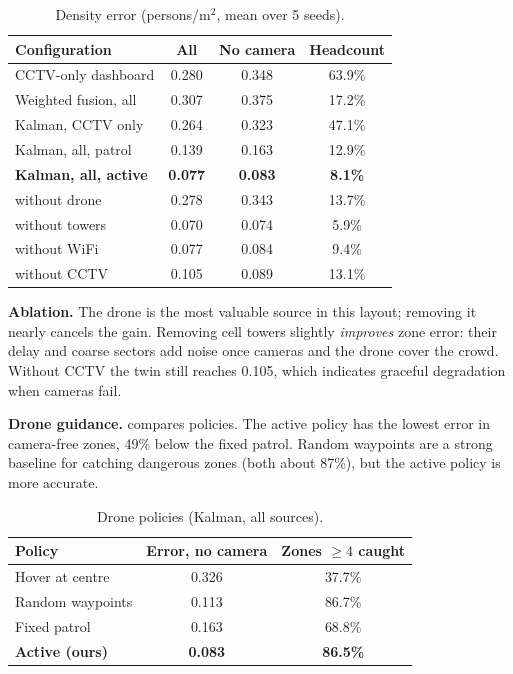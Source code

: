 \documentclass[10pt,twocolumn]{article}
\begin{document}
\begin{table}[t]
\centering\small
\caption{Density error (persons/m$^2$, mean over 5 seeds).}
\label{tab:fusion}
\begin{tabular}{@{}lccc@{}}
\toprule
Configuration & All & No camera & Headcount \\
\midrule
CCTV-only dashboard & 0.280 & 0.348 & 63.9\% \\
Weighted fusion, all & 0.307 & 0.375 & 17.2\% \\
Kalman, CCTV only & 0.264 & 0.323 & 47.1\% \\
Kalman, all, patrol & 0.139 & 0.163 & 12.9\% \\
\textbf{Kalman, all, active} & \textbf{0.077} & \textbf{0.083} & \textbf{8.1\%} \\
\midrule
\quad without drone & 0.278 & 0.343 & 13.7\% \\
\quad without towers & 0.070 & 0.074 & 5.9\% \\
\quad without WiFi & 0.077 & 0.084 & 9.4\% \\
\quad without CCTV & 0.105 & 0.089 & 13.1\% \\
\bottomrule
\end{tabular}
\end{table}

\textbf{Ablation.} The drone is the most valuable source in this layout; removing it nearly cancels the gain. Removing cell towers slightly \emph{improves} zone error: their delay and coarse sectors add noise once cameras and the drone cover the crowd. Without CCTV the twin still reaches 0.105, which indicates graceful degradation when cameras fail.

\textbf{Drone guidance.}  compares policies. The active policy has the lowest error in camera-free zones, 49\% below the fixed patrol. Random waypoints are a strong baseline for catching dangerous zones (both about 87\%), but the active policy is more accurate.

\begin{table}[t]
\centering\small
\caption{Drone policies (Kalman, all sources).}
\label{tab:drone}
\begin{tabular}{@{}lcc@{}}
\toprule
Policy & Error, no camera & Zones $\geq 4$ caught \\
\midrule
Hover at centre & 0.326 & 37.7\% \\
Random waypoints & 0.113 & 86.7\% \\
Fixed patrol & 0.163 & 68.8\% \\
\textbf{Active (ours)} & \textbf{0.083} & \textbf{86.5\%} \\
\bottomrule
\end{tabular}
\end{table}
\end{document}
